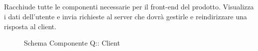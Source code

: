 \subsection{}
Racchiude tutte le componenti necessarie per il front-end del prodotto. Visualizza i dati dell'utente e invia richieste al server che dovrà gestirle e reindirizzare una risposta al client.
\begin{figure}[H]
\centering
\noindent{}
\caption[Schema Componente Client]{Schema Componente Q:: Client}
\end{figure}
